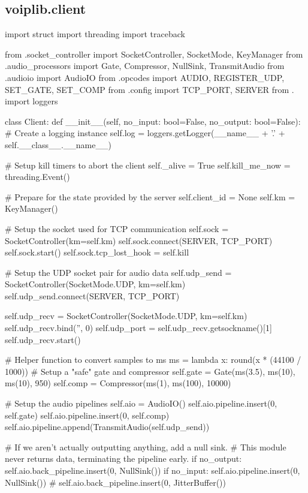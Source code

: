 \subsection{voiplib.client}
\begin{pythoncode}
import struct
import threading
import traceback

from .socket_controller import SocketController, SocketMode, KeyManager
from .audio_processors import Gate, Compressor, NullSink, TransmitAudio
from .audioio import AudioIO
from .opcodes import AUDIO, REGISTER_UDP, SET_GATE, SET_COMP
from .config import TCP_PORT, SERVER
from . import loggers


class Client:
    def __init__(self, no_input: bool=False, no_output: bool=False):
        # Create a logging instance
        self.log = loggers.getLogger(__name__ + '.' + self.__class__.__name__)

        # Setup kill timers to abort the client
        self._alive = True
        self.kill_me_now = threading.Event()

        # Prepare for the state provided by the server
        self.client_id = None
        self.km = KeyManager()

        # Setup the socket used for TCP communication
        self.sock = SocketController(km=self.km)
        self.sock.connect(SERVER, TCP_PORT)
        self.sock.start()
        self.sock.tcp_lost_hook = self.kill

        # Setup the UDP socket pair for audio data
        self.udp_send = SocketController(SocketMode.UDP, km=self.km)
        self.udp_send.connect(SERVER, TCP_PORT)

        self.udp_recv = SocketController(SocketMode.UDP, km=self.km)
        self.udp_recv.bind('', 0)
        self.udp_port = self.udp_recv.getsockname()[1]
        self.udp_recv.start()

        # Helper function to convert samples to ms
        ms = lambda x: round(x * (44100 / 1000))
        # Setup a "safe" gate and compressor
        self.gate = Gate(ms(3.5), ms(10), ms(10), 950)
        self.comp = Compressor(ms(1), ms(100), 10000)

        # Setup the audio pipelines
        self.aio = AudioIO()
        self.aio.pipeline.insert(0, self.gate)
        self.aio.pipeline.insert(0, self.comp)
        self.aio.pipeline.append(TransmitAudio(self.udp_send))

        # If we aren't actually outputting anything, add a null sink.
        # This module never returns data, terminating the pipeline early.
        if no_output:
            self.aio.back_pipeline.insert(0, NullSink())
        if no_input:
            self.aio.pipeline.insert(0, NullSink())
        # self.aio.back\_pipeline.insert(0, JitterBuffer())


\end{pythoncode}

